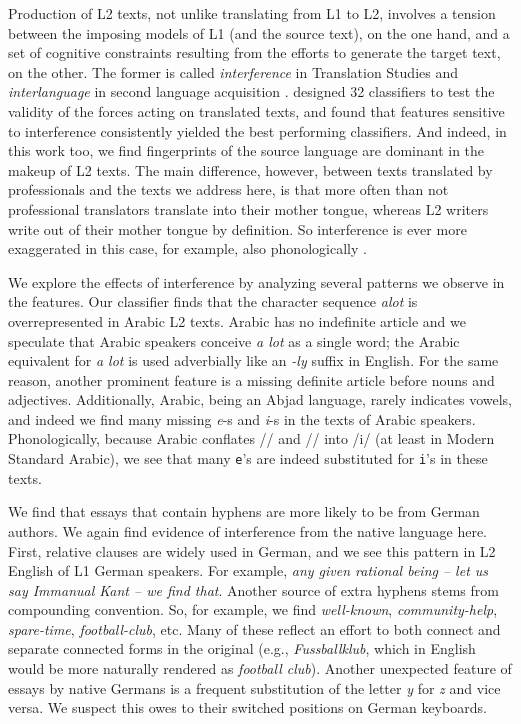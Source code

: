 \documentclass[11pt,letterpaper]{article}
\newcommand{\textnl}{\textsl}
\begin{document}
Production of L2 texts, not unlike translating from L1 to L2, involves
a tension between the imposing models of L1 (and the source text), on
the one hand, and a set of cognitive constraints resulting from the
efforts to generate the target text, on the other. The former is
called \emph{interference} in Translation Studies \citep{Toury:1995}
and \emph{interlanguage} in second language acquisition
\citep{Selinker1972}. \citet{vered:noam:shuly} designed 32 classifiers to test the validity
of the forces acting on translated texts, and found that features sensitive to interference
consistently yielded the best performing classifiers. And indeed, in
this work too, we find fingerprints of the source language are dominant in the
makeup of L2 texts. The main difference, however, between texts translated by
professionals and the texts we address here, is that more often than
not professional translators translate into their mother tongue,
whereas L2 writers write out of their mother tongue by definition. So
interference is ever more exaggerated in this case, for example, also
phonologically \citep{tsur-rappoport:2007:Cognitive-2007}.

We explore the effects of interference by analyzing several patterns we observe in the features.
Our classifier finds that the
character sequence \textnl{alot} is overrepresented in Arabic L2
texts. Arabic has no indefinite article and we speculate that Arabic
speakers conceive \textnl{a lot} as a single word; the Arabic
equivalent for \textnl{a lot} is used adverbially like an \textnl{-ly}
suffix in English. For the same reason, another prominent feature is a
missing definite article before nouns and adjectives. Additionally,
Arabic, being an Abjad language, rarely indicates vowels, and indeed
we find many missing \textnl{e}-s and \textnl{i}-s in the texts of
Arabic speakers. Phonologically, because Arabic conflates
// and // into /i/ (at least in Modern Standard
Arabic), we see that many {\tt e}'s are indeed substituted for
{\tt i}'s in these texts.

We find that essays that contain hyphens are more likely to be from German authors. We again find evidence of interference from the native language here. First, relative clauses are widely used in German, and we see this pattern in L2 English of L1 German speakers. For example, \textnl{any
  given rational being -- let us say Immanual Kant -- we find
  that}. Another source of extra hyphens stems from compounding convention. So, for example, we find \textnl{well-known},
\textnl{community-help}, \textnl{spare-time}, \textnl{football-club},
etc. Many of these reflect an effort to both connect and separate
connected forms in the original (e.g., \textnl{Fussballklub}, which in
English would be more naturally rendered as \textnl{football club}).
Another unexpected feature of essays by native Germans is a frequent substitution of the
letter \textnl{y} for \textnl{z} and vice versa. We suspect this owes to their switched positions on German keyboards.
 
\end{document}
